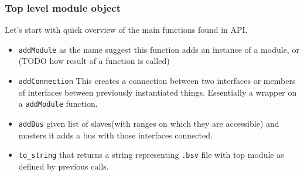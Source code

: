 \documentclass[14pt]{report}
\begin{document}
\subsubsection{Top level module object}
Let's start with quick overview of the main functions found in API.
\begin{itemize}
    \item \verb!addModule! as the name suggest this function adds an instance of a module, or (TODO how result of a function is called)
    \item \verb!addConnection! This creates a connection between two interfaces or members of interfaces between previously instantiated things. Essentially a wrapper on a \verb!addModule! function.
    \item \verb!addBus! given list of slaves(with ranges on which they are accessible) and masters it adds a bus with those interfaces connected.
    \item \verb!to_string! that returns a string representing \verb!.bsv! file with top module as defined by previous calls.
\end{itemize}
\end{document}
